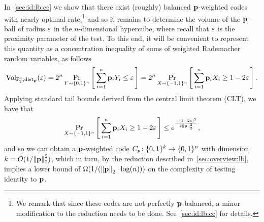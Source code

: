  In~\cref{sec:id:lb:cc} we show that there exist (roughly) balanced $\mathbf{p}$-weighted codes with nearly-optimal rate,\footnote{We remark that since these codes are not perfectly $\mathbf{p}$-balanced, a minor modification to the reduction needs to be done. See~\cref{sec:id:lb:cc} for details.} and so it remains to determine the volume of the $\mathbf{p}$-ball of radius $\varepsilon$ in the $n$-dimensional hypercube, where recall that $\varepsilon$ is the proximity parameter of the test. To this end, it will be convenient to represent this quantity as a concentration inequality of sums of weighted Rademacher random variables, as follows
   \begin{equation}
   \label{eq:Vol:overview}
    \operatorname{Vol}_{\mathbb{F}_2^n,\pdistfunc[\p]}(\eps)
        = 2^n \probaDistrOf{Y \sim \bitset^n }{ \sum_{i=1}^n \p_i Y_i \leq \eps } 
        = 2^n \probaDistrOf{X \sim \{-1,1\}^n }{ \sum_{i=1}^n \p_i X_i \geq 1-2\eps}. 
  \end{equation}
    Applying standard tail bounds derived from the central limit theorem (CLT), we have that
   \begin{equation}
   \label{eq:CLT}
 \probaDistrOf{X \sim \{-1,1\}^n }{ \sum_{i=1}^n \p_i X_i \geq 1-2\eps} \le e^{\frac{-(1-2\eps)^2}{2\normtwo{\p}^2}},
  \end{equation}
  and so we can obtain a $\mathbf{p}$-weighted code $C_p\colon\{0,1\}^k \to \{0,1\}^n$ with dimension $k = O(1/{\lVert\mathbf{p}{\rVert}}_2^2)$, which in turn, by the reduction described in~\cref{sec:overview:lb}, implies a lower bound of $\bigOmega{1/(\normtwo{\p} \cdot \log(n))}$ on the complexity of testing identity to $\mathbf{p}$.
  
